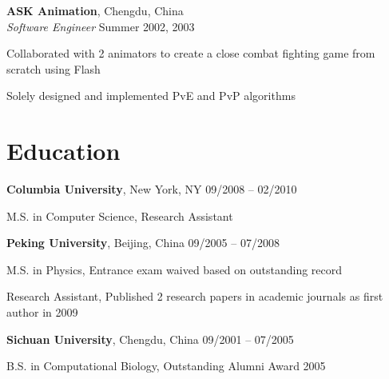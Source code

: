 \documentclass[margin,line]{resume}
\begin{document}
\begin{resume}
    \textbf{ASK Animation}, Chengdu, China \\
    \textsl{Software Engineer} \hfill Summer 2002, 2003 \vspace{-3mm}\\\vspace{-1mm}%
     \begin{list2}
      \item Collaborated with 2 animators to create a close combat fighting game from scratch using Flash 
      \item Solely designed and implemented PvE and PvP algorithms
     \end{list2}

      

    \section{\mysidestyle Education}

    \textbf{Columbia University}, New York, NY \hfill 09/2008 -- 02/2010 \vspace{-3mm}\\\vspace{-1mm}%
      \begin{list2}
       \item M.S. in Computer Science, Research Assistant
      \end{list2}
 

    \textbf{Peking University}, Beijing, China \hfill 09/2005 -- 07/2008 \vspace{-3mm}\\\vspace{-1mm}%
      \begin{list2}
       \item M.S. in Physics, Entrance exam waived based on outstanding record
       \item Research Assistant, Published 2 research papers in academic journals as first author in 2009
      \end{list2}
    
    \textbf{Sichuan University}, Chengdu, China \hfill 09/2001 -- 07/2005 \vspace{-3mm}\\\vspace{-1mm}%
      \begin{list2}
       \item B.S. in Computational Biology, Outstanding Alumni Award 2005
      \end{list2}


\end{resume}
\end{document}
